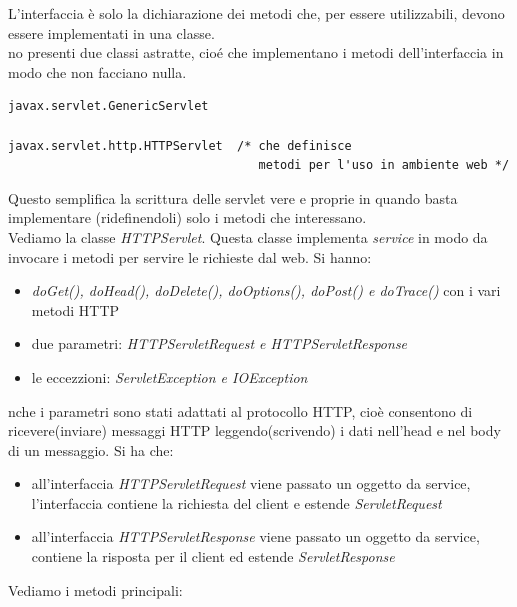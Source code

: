 \documentclass[a4paper,12pt, oneside]{book}
\begin{document}
L'interfaccia è solo la dichiarazione dei metodi che, per essere utilizzabili, devono essere implementati in una classe.\\
no presenti due classi astratte, cioé che implementano i metodi dell’interfaccia in modo che non facciano nulla. 
\begin{verbatim}
javax.servlet.GenericServlet 

javax.servlet.http.HTTPServlet  /* che definisce 
                                   metodi per l'uso in ambiente web */
\end{verbatim}
Questo semplifica la scrittura delle servlet vere e proprie in quando basta implementare (ridefinendoli) solo i metodi che interessano.\\
Vediamo la classe \textit{HTTPServlet}. Questa classe implementa \textit{service} in modo da invocare i metodi per servire le richieste dal web. Si hanno:
\begin{itemize}
	\item \textit{doGet(), doHead(), doDelete(), doOptions(), doPost() e doTrace()} con i vari metodi HTTP
	\item due parametri: \textit{HTTPServletRequest e HTTPServletResponse}
	\item le eccezzioni: \textit{ServletException e IOException}
\end{itemize}
nche i parametri sono stati adattati al protocollo HTTP, cioè consentono di ricevere(inviare) messaggi HTTP leggendo(scrivendo) i dati nell'head e nel body di un messaggio. Si ha che:
\begin{itemize}
	\item all'interfaccia \textit{HTTPServletRequest} viene passato un oggetto da service, l'interfaccia contiene la richiesta del client e estende \textit{ServletRequest}
	\item all'interfaccia \textit{HTTPServletResponse} viene passato un oggetto da service, contiene la risposta per il client ed estende \textit{ServletResponse}
\end{itemize}
Vediamo i metodi principali:
\end{document}
